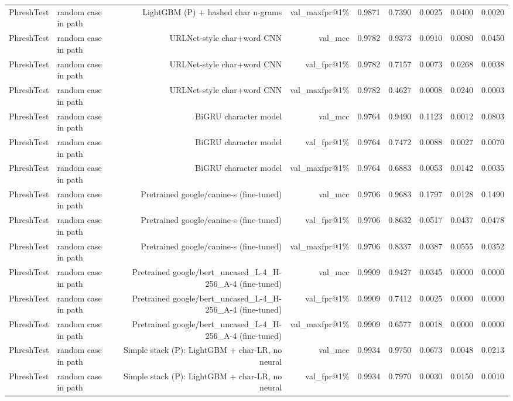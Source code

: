 \begin{table}[t]
\begin{tabular}{llrrrrrrr}
PhreshTest & random case in path & LightGBM (P) + hashed char n-grams & val\_maxfpr@1\% & 0.9871 & 0.7390 & 0.0025 & 0.0400 & 0.0020 \\
PhreshTest & random case in path & URLNet-style char+word CNN & val\_mcc & 0.9782 & 0.9373 & 0.0910 & 0.0080 & 0.0450 \\
PhreshTest & random case in path & URLNet-style char+word CNN & val\_fpr@1\% & 0.9782 & 0.7157 & 0.0073 & 0.0268 & 0.0038 \\
PhreshTest & random case in path & URLNet-style char+word CNN & val\_maxfpr@1\% & 0.9782 & 0.4627 & 0.0008 & 0.0240 & 0.0003 \\
PhreshTest & random case in path & BiGRU character model & val\_mcc & 0.9764 & 0.9490 & 0.1123 & 0.0012 & 0.0803 \\
PhreshTest & random case in path & BiGRU character model & val\_fpr@1\% & 0.9764 & 0.7472 & 0.0088 & 0.0027 & 0.0070 \\
PhreshTest & random case in path & BiGRU character model & val\_maxfpr@1\% & 0.9764 & 0.6883 & 0.0053 & 0.0142 & 0.0035 \\
PhreshTest & random case in path & Pretrained google/canine-s (fine-tuned) & val\_mcc & 0.9706 & 0.9683 & 0.1797 & 0.0128 & 0.1490 \\
PhreshTest & random case in path & Pretrained google/canine-s (fine-tuned) & val\_fpr@1\% & 0.9706 & 0.8632 & 0.0517 & 0.0437 & 0.0478 \\
PhreshTest & random case in path & Pretrained google/canine-s (fine-tuned) & val\_maxfpr@1\% & 0.9706 & 0.8337 & 0.0387 & 0.0555 & 0.0352 \\
PhreshTest & random case in path & Pretrained google/bert\_uncased\_L-4\_H-256\_A-4 (fine-tuned) & val\_mcc & 0.9909 & 0.9427 & 0.0345 & 0.0000 & 0.0000 \\
PhreshTest & random case in path & Pretrained google/bert\_uncased\_L-4\_H-256\_A-4 (fine-tuned) & val\_fpr@1\% & 0.9909 & 0.7412 & 0.0025 & 0.0000 & 0.0000 \\
PhreshTest & random case in path & Pretrained google/bert\_uncased\_L-4\_H-256\_A-4 (fine-tuned) & val\_maxfpr@1\% & 0.9909 & 0.6577 & 0.0018 & 0.0000 & 0.0000 \\
PhreshTest & random case in path & Simple stack (P): LightGBM + char-LR, no neural & val\_mcc & 0.9934 & 0.9750 & 0.0673 & 0.0048 & 0.0213 \\
PhreshTest & random case in path & Simple stack (P): LightGBM + char-LR, no neural & val\_fpr@1\% & 0.9934 & 0.7970 & 0.0030 & 0.0150 & 0.0010 \\

\end{tabular}
\end{table}

